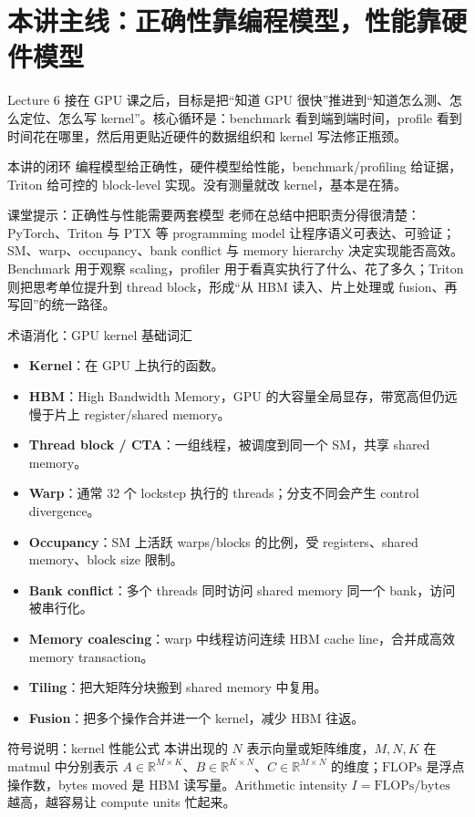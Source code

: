\section{本讲主线：正确性靠编程模型，性能靠硬件模型}
Lecture 6 接在 GPU 课之后，目标是把“知道 GPU 很快”推进到“知道怎么测、怎么定位、怎么写 kernel”。核心循环是：benchmark 看到端到端时间，profile 看到时间花在哪里，然后用更贴近硬件的数据组织和 kernel 写法修正瓶颈。
\begin{importantbox}{本讲的闭环}
编程模型给正确性，硬件模型给性能，benchmark/profiling 给证据，Triton 给可控的 block-level 实现。没有测量就改 kernel，基本是在猜。
\end{importantbox}

\begin{knowledgebox}{课堂提示：正确性与性能需要两套模型}
老师在总结中把职责分得很清楚：PyTorch、Triton 与 PTX 等 programming model 让程序语义可表达、可验证；SM、warp、occupancy、bank conflict 与 memory hierarchy 决定实现能否高效。Benchmark 用于观察 scaling，profiler 用于看真实执行了什么、花了多久；Triton 则把思考单位提升到 thread block，形成“从 HBM 读入、片上处理或 fusion、再写回”的统一路径。
\end{knowledgebox}

\begin{knowledgebox}{术语消化：GPU kernel 基础词汇}
\begin{itemize}
    \item \textbf{Kernel}：在 GPU 上执行的函数。
    \item \textbf{HBM}：High Bandwidth Memory，GPU 的大容量全局显存，带宽高但仍远慢于片上 register/shared memory。
    \item \textbf{Thread block / CTA}：一组线程，被调度到同一个 SM，共享 shared memory。
    \item \textbf{Warp}：通常 32 个 lockstep 执行的 threads；分支不同会产生 control divergence。
    \item \textbf{Occupancy}：SM 上活跃 warps/blocks 的比例，受 registers、shared memory、block size 限制。
    \item \textbf{Bank conflict}：多个 threads 同时访问 shared memory 同一个 bank，访问被串行化。
    \item \textbf{Memory coalescing}：warp 中线程访问连续 HBM cache line，合并成高效 memory transaction。
    \item \textbf{Tiling}：把大矩阵分块搬到 shared memory 中复用。
    \item \textbf{Fusion}：把多个操作合并进一个 kernel，减少 HBM 往返。
\end{itemize}
\end{knowledgebox}

\begin{knowledgebox}{符号说明：kernel 性能公式}
本讲出现的 \(N\) 表示向量或矩阵维度，\(M,N,K\) 在 matmul 中分别表示 \(A\in\mathbb{R}^{M\times K}\)、\(B\in\mathbb{R}^{K\times N}\)、\(C\in\mathbb{R}^{M\times N}\) 的维度；\(\mathrm{FLOPs}\) 是浮点操作数，bytes moved 是 HBM 读写量。Arithmetic intensity \(I=\mathrm{FLOPs}/\mathrm{bytes}\) 越高，越容易让 compute units 忙起来。
\end{knowledgebox}
